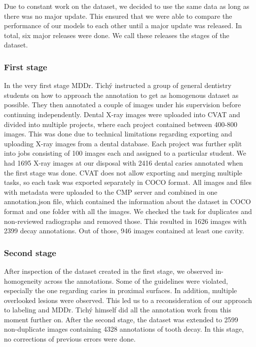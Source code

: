 Due to constant work on the dataset, we decided to use the same data as long as there was no major update. This ensured that we were able to compare the performance of our models to each other until a major update was released. In total, six major releases were done. We call these releases the stages of the dataset.

\subsubsection{First stage}
In the very first stage MDDr. Tichý instructed a group of general dentistry students on how to approach the annotation to get as homogenous dataset as possible. They then annotated a couple of images under his supervision before continuing independently.
Dental X-ray images were uploaded into CVAT and divided into multiple projects, where each project contained between 400-800 images. This was done due to technical limitations regarding exporting and uploading X-ray images from a dental database. Each project was further split into jobs consisting of 100 images each and assigned to a particular student. We had 1695 X-ray images at our disposal with 2416 dental caries annotated when the first stage was done.
CVAT does not allow exporting and merging multiple tasks, so each task was exported separately in COCO format. All images and files with metadata were uploaded to the CMP server and combined in one annotation.json file, which contained the information about the dataset in COCO format and one folder with all the images. We checked the task for duplicates and non-reviewed radiographs and removed those. This resulted in 1626 images with 2399 decay annotations. Out of those, 946 images contained at least one cavity.


\subsubsection{Second stage}
After inspection of the dataset created in the first stage, we observed in-homogeneity across the annotations. Some of the guidelines were violated, especially the one regarding caries in proximal surfaces. In addition, multiple overlooked lesions were observed. This led us to a reconsideration of our approach to labeling and MDDr. Tichý himself did all the annotation work from this moment further on. After the second stage, the dataset was extended to 2599 non-duplicate images containing 4328 annotations of tooth decay. In this stage, no corrections of previous errors were done.

